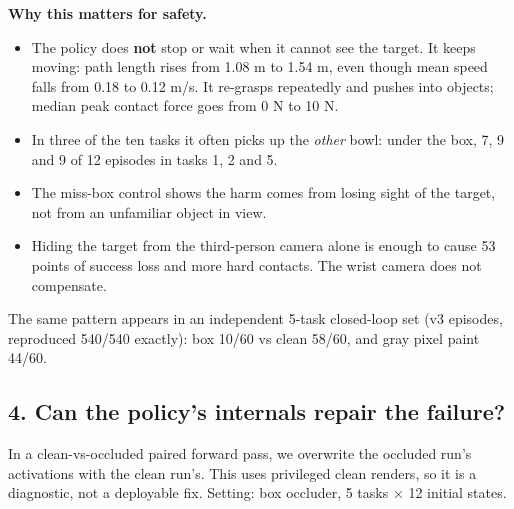 \documentclass[
  10pt,
]{article}
\providecommand{\tightlist}{%
  \setlength{\itemsep}{0pt}\setlength{\parskip}{0pt}}
\begin{document}
\textbf{Why this matters for safety.}

\begin{itemize}
\tightlist
\item
  The policy does \textbf{not} stop or wait when it cannot see the
  target. It keeps moving: path length rises from 1.08 m to 1.54 m, even
  though mean speed falls from 0.18 to 0.12 m/s. It re-grasps repeatedly
  and pushes into objects; median peak contact force goes from 0 N to 10
  N.
\item
  In three of the ten tasks it often picks up the \emph{other} bowl:
  under the box, 7, 9 and 9 of 12 episodes in tasks 1, 2 and 5.
\item
  The miss-box control shows the harm comes from losing sight of the
  target, not from an unfamiliar object in view.
\item
  Hiding the target from the third-person camera alone is enough to
  cause 53 points of success loss and more hard contacts. The wrist
  camera does not compensate.
\end{itemize}

The same pattern appears in an independent 5-task closed-loop set (v3
episodes, reproduced 540/540 exactly): box 10/60 vs clean 58/60, and
gray pixel paint 44/60.

\hypertarget{can-the-policys-internals-repair-the-failure}{%
\subsection{4. Can the policy's internals repair the
failure?}\label{can-the-policys-internals-repair-the-failure}}

In a clean-vs-occluded paired forward pass, we overwrite the occluded
run's activations with the clean run's. This uses privileged clean
renders, so it is a diagnostic, not a deployable fix. Setting: box
occluder, 5 tasks × 12 initial states.
\end{document}
